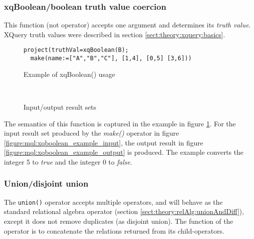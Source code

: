 \subsubsection{xqBoolean/boolean truth value coercion}

This function (not operator) accepts one argument and determines its \textit{truth value}. XQuery truth values
were described in section \ref{sect:theory:xquery:basics}.

\begin{figure}[!h]
\centering
\begin{Verbatim}
project(truthVal=xqBoolean(B); 
  make(name:=["A","B","C"], [1,4], [0,5] [3,6]))
\end{Verbatim}
\caption{Example of xqBoolean() usage}
\label{figure:mql:xqboolean_example}
\end{figure}

\begin{figure}[!h]
\centering
\mbox{
\quad
{}
}
\caption{Input/output result sets}
\end{figure}

The semantics of this function is captured in the example in figure
\ref{figure:mql:xqboolean_example}. For the input result set produced by the
\textit{make()} operator in figure \ref{figure:mql:xqboolean_example_input},
the output result in figure \ref{figure:mql:xqboolean_example_output} is
produced. The example converts the integer 5 to \textit{true} and the integer 0
to \textit{false}. 

\subsubsection{Union/disjoint union}
The \texttt{union()} operator accepts multiple operators, and will behave as the standard relational algebra
operator (section \ref{sect:theory:relAlg:unionAndDiff}), except it does not remove duplicates (as disjoint
union). The function of the operator is to concatenate the relations returned from its child-operators.